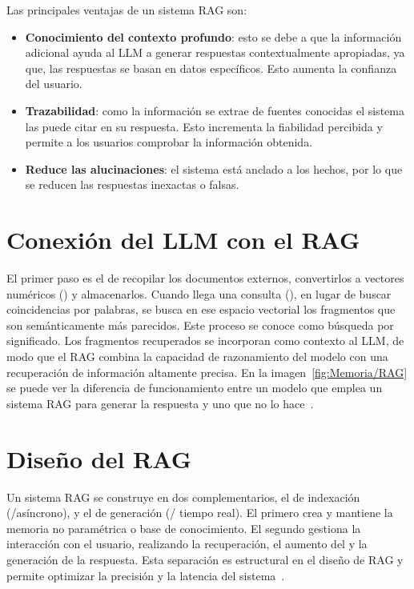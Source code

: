 Las principales ventajas de un sistema RAG son:
\begin{itemize}
\tightlist
	\item \textbf{Conocimiento del contexto profundo}: esto se debe a que la información adicional ayuda al LLM a generar respuestas contextualmente apropiadas, ya que, las respuestas se basan en datos específicos. Esto aumenta la confianza del usuario.
	\item \textbf{Trazabilidad}: como la información se extrae de fuentes conocidas el sistema las puede citar en su respuesta. Esto incrementa la fiabilidad percibida y permite a los usuarios comprobar la información obtenida.
	\item \textbf{Reduce las alucinaciones}: el sistema está anclado a los hechos, por lo que se reducen las respuestas inexactas o falsas. 
\end{itemize}

\section{Conexión del LLM con el RAG}
El primer paso es el de recopilar los documentos externos, convertirlos a vectores numéricos () y almacenarlos. Cuando llega una consulta (), en lugar de buscar coincidencias por palabras, se busca en ese espacio vectorial los fragmentos que son semánticamente más parecidos. Este proceso se conoce como búsqueda por significado. Los fragmentos recuperados se incorporan como contexto al LLM, de modo que el RAG combina la capacidad de razonamiento del modelo con una recuperación de información altamente precisa. En la imagen~\ref{fig:Memoria/RAG} se puede ver la diferencia de funcionamiento entre un modelo que emplea un sistema RAG para generar la respuesta y uno que no lo hace~\cite{RAG:image}.


\section{Diseño del RAG}
Un sistema RAG se construye en dos  complementarios, el de indexación (/asíncrono), y el de generación (/ tiempo real). El primero crea y mantiene la memoria no paramétrica o base de conocimiento. El segundo gestiona la interacción con el usuario, realizando la recuperación, el aumento del  y la generación de la respuesta. Esta separación es estructural en el diseño de RAG y permite optimizar la precisión y la latencia del sistema~\cite{book:RAG_SimpleGuide}.

